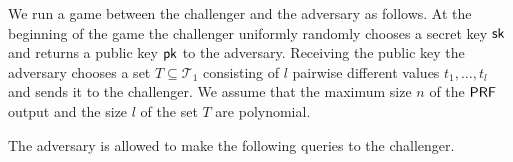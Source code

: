 \documentclass{article}
\begin{document}
We run a game between the challenger and the adversary as follows. At the beginning of the game the challenger uniformly randomly chooses a secret key $\mathsf{sk}$ and returns a public key $\mathsf{pk}$ to the adversary. Receiving the public key the adversary chooses a set $T \subseteq \mathcal{T}_1$ consisting of $l$ pairwise different values $t_1,\ldots,t_l$ and sends it to the challenger.  We assume that the maximum size $n$ of the $\mathsf{PRF}$ output and the size $l$ of the set $T$ are polynomial. 

% 

The adversary is allowed to make the following queries to the challenger.
\end{document}

